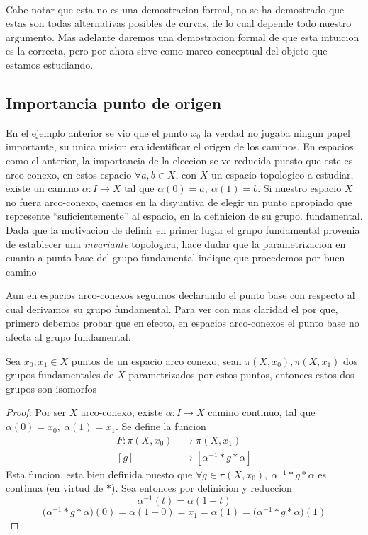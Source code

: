 {\paragraph{} Cabe notar que esta no es una demostracion formal, no se ha demostrado
que estas son todas alternativas posibles de curvas, de lo cual depende
todo nuestro argumento. Mas adelante daremos una demostracion formal de
que esta intuicion es la correcta, pero por ahora sirve como marco
conceptual del objeto que estamos estudiando.

\subsection{Importancia punto de origen}
En el ejemplo anterior se vio que el punto \(x_0\) la verdad no
jugaba ningun papel importante, su unica mision era identificar el
origen de los caminos. En espacios como el anterior, la importancia de
la eleccion se ve reducida puesto que este es arco-conexo, en estos
espacio \(\forall a,b \in X\), con \(X\) un espacio topologico a
estudiar, existe un camino \(\alpha : I \to X\) tal que \(\alpha (0) =
a,\ \alpha (1) = b\). Si nuestro espacio \(X\) no fuera arco-conexo,
caemos en la disyuntiva de elegir un punto apropiado que represente
``suficientemente'' al espacio, en la definicion de su grupo.
fundamental. Dada que la motivacion de definir en primer lugar el grupo
fundamental provenia de establecer una \emph{invariante} topologica,
hace dudar que la parametrizacion en cuanto a punto base del grupo
fundamental indique que procedemos por buen camino

Aun en espacios arco-conexos seguimos declarando el punto base con
respecto al cual derivamos su grupo fundamental. Para ver con mas
claridad el por que, primero debemos probar que en efecto, en espacios
arco-conexos el punto base no afecta al grupo fundamental.
\begin{teorema}
  Sea \(x_0 , x_1 \in X\) puntos de un espacio arco conexo, sean \(\pi
  (X, x_0), \pi (X, x_1)\) dos grupos fundamentales de \(X\)
  parametrizados por estos puntos, entonces estos dos grupos son isomorfos
\end{teorema}
\begin{proof}
  Por ser \(X\) arco-conexo, existe \(\alpha : I \to X\) camino
  continuo, tal que \(\alpha (0) = x_0,\ \alpha (1) = x_1\). Se define
  la funcion
  \begin{align*}
    F : \pi (X, x_0) &\to \pi (X, x_1) \\
    [g] &\mapsto [ \alpha^{-1} * g * \alpha ]
  \end{align*}
  Esta funcion, esta bien definida puesto que \(\forall g \in \pi (X,
  x_0),\ \alpha^{-1} * g * \alpha \) es continua (en virtud de \(*\)).
  Sea entonces por definicion y reduccion
  \[ \alpha^{-1} (t) = \alpha (1 - t)\]
  \[\big(\alpha^{-1} * g * \alpha \big) (0) = \alpha (1 - 0) = x_1 = \alpha (1) =
    \big(\alpha^{-1} * g * \alpha \big) (1)\]


\end{proof}}
